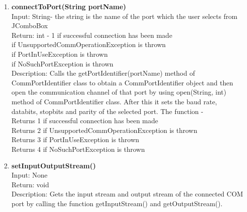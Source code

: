 \documentclass{article}
\begin{document}
\begin{enumerate}
		\newpage
		\item \textbf{connectToPort(String portName)} \vspace{0.25cm} \\
		Input: String- the string is the name of the port which the user selects from JComboBox\\
		Return: int - 1 if successful connection has been made\\
		              \qquad \qquad {} if UnsupportedCommOperationException is thrown\\
		              \qquad \qquad {} if PortInUseException is thrown\\
		               \qquad \qquad {} if NoSuchPortException is thrown \\
		Description: Calls the getPortIdentifier(portName) method of CommPortIdentifier class to obtain a CommPortIdentifier object and then open the communication channel of that port by using open(String, int) method of CommPortIdentifier class. After this it sets the baud rate, databits, stopbits and parity of the selected port. The function -\\
		Returns 1 if successful connection has been made\\
		Returns 2 if UnsupportedCommOperationException is thrown\\
		Returns 3 if PortInUseException is thrown\\
		Returns 4 if NoSuchPortException is thrown \vspace{0.5cm}\\
		\item \textbf{setInputOutputStream()} \vspace{0.25cm} \\
		Input: None \\
		Return: void\\
		Description: Gets the input stream and output stream of the connected COM port by calling the function getInputStream() and getOutputStream(). \vspace{0.5cm} \\
	\end{enumerate}
\end{document}

